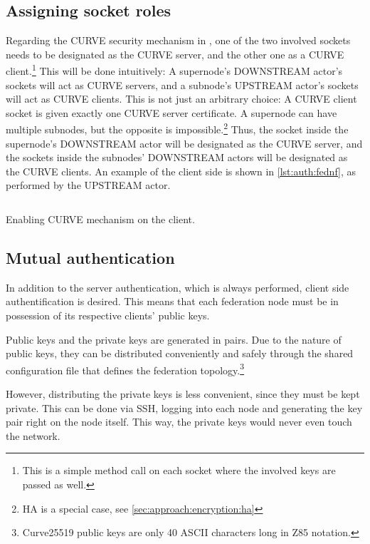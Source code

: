 \subsection{Assigning socket roles}
Regarding the CURVE security mechanism in \zmq, one of the two involved sockets
needs to be designated as the CURVE server, and the other one as a CURVE
client.\footnote{This is a simple method call on each socket where the involved
keys are passed as well.} This will be done intuitively: A supernode's
DOWNSTREAM actor's sockets will act as CURVE servers, and a subnode's
UPSTREAM actor's sockets will act as CURVE clients. This is not just an
arbitrary choice: A CURVE client socket is given exactly one CURVE server
certificate. A supernode can have multiple subnodes, but the opposite is
impossible.\footnote{HA is a special case, see
\autoref{sec:approach:encryption:ha}} Thus, the socket inside the supernode's
DOWNSTREAM actor will be designated as the CURVE server, and the sockets
inside the subnodes' DOWNSTREAM actors will be designated as the CURVE
clients. An example of the client side is shown in \autoref{lst:auth:fednf}, as
performed by the UPSTREAM actor.

\begin{listing}
	\inputminted[bgcolor=bg]{Ruby}{listings/auth/fednf.rb}
	\caption{Enabling CURVE mechanism on the client.}
	\label{lst:auth:fednf}
\end{listing}

\subsection{Mutual authentication}
In addition to the server authentication, which is always performed, client
side authentification is desired. This means that each federation node must be
in possession of its respective clients' public keys.

Public keys and the private keys are generated in pairs.  Due to
the nature of public keys, they can be distributed conveniently and safely
through the shared configuration file that defines the federation
topology.\footnote{Curve25519 public keys are only 40 ASCII characters long in
\gls{Z85} notation.}

However, distributing the private keys is less convenient, since they must be kept
private. This can be done via \gls{SSH}, logging into each node and generating
the key pair right on the node itself. This way, the private keys would never
even touch the network.

